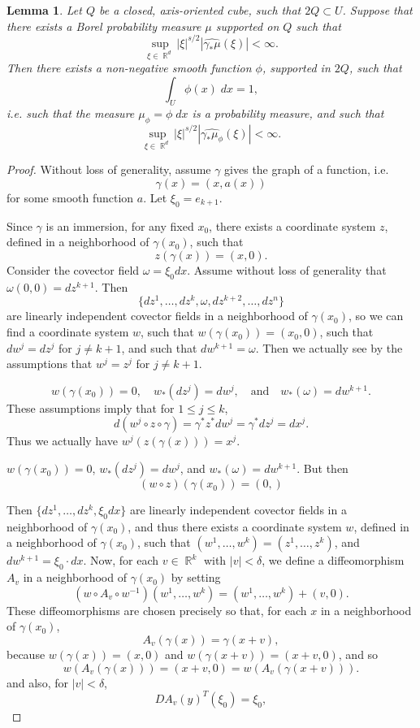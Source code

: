 \documentclass[dvipsnames,letterpaper,12pt]{article}
\DeclareMathOperator{\RR}{\mathbb{R}}
\newtheorem{lemma}[theorem]{Lemma}
\begin{document}
\begin{lemma}
    Let $Q$ be a closed, axis-oriented cube, such that $2Q \subset U$. Suppose that there exists a Borel probability measure $\mu$ supported on $Q$ such that
    \[ \sup_{\xi \in \RR^d} |\xi|^{s/2} |\widehat{\gamma_* \mu}(\xi)| < \infty. \]
    Then there exists a non-negative smooth function $\phi$, supported in $2Q$, such that
    \[ \int_U \phi(x)\; dx = 1, \]
    i.e. such that the measure $\mu_\phi = \phi\; dx$ is a probability measure, and such that
    \[ \sup_{\xi \in \RR^d} |\xi|^{s/2} |\widehat{\gamma_* \mu_\phi}(\xi)| < \infty. \]
\end{lemma}
\begin{proof}

    Without loss of generality, assume $\gamma$ gives the graph of a function, i.e.
    \[ \gamma(x) = (x, a(x)) \]
    for some smooth function $a$. Let $\xi_0 = e_{k+1}$.

    Since $\gamma$ is an immersion, for any fixed $x_0$, there exists a coordinate system $z$, defined in a neighborhood of $\gamma(x_0)$, such that
    \[ z(\gamma(x)) = (x,0). \]
    Consider the covector field $\omega = \xi_0 dx$. Assume without loss of generality that $\omega(0,0) = dz^{k+1}$. Then
    \[ \{ dz^1, \dots, dz^k, \omega, dz^{k+2}, \dots, dz^n \} \]
    are linearly independent covector fields in a neighborhood of $\gamma(x_0)$, so we can find a coordinate system $w$, such that $w(\gamma(x_0)) = (x_0,0)$, such that $dw^j = dz^j$ for $j \neq k+1$, and such that $dw^{k+1} = \omega$. Then we actually see by the assumptions that $w^j = z^j$ for $j \neq k + 1$.


    \[ w(\gamma(x_0)) = 0, \quad w_*(dz^j) = dw^j, \quad \text{and}\quad w_*(\omega) = dw^{k+1}. \]
    These assumptions imply that for $1 \leq j \leq k$,
    \[ d(w^j \circ z \circ \gamma) = \gamma^* z^* dw^j = \gamma^* dz^j = dx^j. \]
    Thus we actually have $w^j(z(\gamma(x))) = x^j$.

    $w(\gamma(x_0)) = 0$, $w_*(dz^j) = dw^j$, and $w_*(\omega) = dw^{k+1}$. But then
    \[ (w \circ z)(\gamma(x_0)) = (0, ) \]

    Then $\{ dz^1, \dots, dz^k, \xi_0 dx \}$ are linearly independent covector fields in a neighborhood of $\gamma(x_0)$, and thus there exists a coordinate system $w$, defined in a neighborhood of $\gamma(x_0)$, such that $(w^1,\dots,w^k) = (z^1,\dots,z^k)$, and $dw^{k+1} = \xi_0 \cdot dx$. Now, for each $v \in \RR^k$ with $|v| < \delta$, we define a diffeomorphism $A_v$ in a neighborhood of $\gamma(x_0)$ by setting
    \[ (w \circ A_v \circ w^{-1})(w^1,\dots,w^k) = (w^1,\dots,w^k) + (v,0). \]
    These diffeomorphisms are chosen precisely so that, for each $x$ in a neighborhood of $\gamma(x_0)$,
    \[ A_v( \gamma(x) ) = \gamma(x + v), \]
    because $w(\gamma(x)) = (x,0)$ and $w(\gamma(x + v)) = (x+v,0)$, and so
    \[ w(A_v(\gamma(x))) = (x+v,0) = w(A_v(\gamma(x+v))). \]
    and also, for $|v| < \delta$,
    \[ DA_v(y)^T(\xi_0) = \xi_0, \]


\end{proof}
\end{document}
